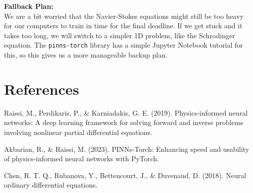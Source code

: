 \documentclass[11pt,a4paper]{article}
\begin{document}
\textbf{Fallback Plan:} \\
We are a bit worried that the Navier-Stokes equations might still be too heavy for our computers to train in time for the final deadline. If we get stuck and it takes too long, we will switch to a simpler 1D problem, like the Schrodinger equation. The \texttt{pinns-torch} library has a simple Jupyter Notebook tutorial for this, so this gives us a more manageable backup plan.

\section*{References}

Raissi, M., Perdikaris, P., \& Karniadakis, G. E. (2019). Physics-informed neural networks: A deep learning framework for solving forward and inverse problems involving nonlinear partial differential equations.

Akbarian, R., \& Raissi, M. (2023). PINNs-Torch: Enhancing speed and usability of physics-informed neural networks with PyTorch.

Chen, R. T. Q., Rubanova, Y., Bettencourt, J., \& Duvenaud, D. (2018). Neural ordinary differential equations.
\end{document}
